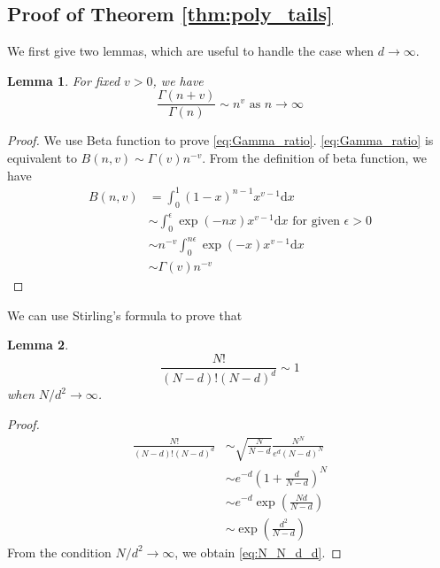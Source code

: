 \documentclass[conference,a4paper]{IEEEtran}
\def\dd{\mathrm{d}}
\newtheorem{lemma}{Lemma}
\begin{document}
\subsection{Proof of Theorem \ref{thm:poly_tails}}
We first give two lemmas, which are useful to handle the case when $d\to \infty$.
\begin{lemma}\label{lem:Gamma_ratio}
     For fixed $v>0$, we have
     \begin{equation}\label{eq:Gamma_ratio}
         \frac{\Gamma(n+v)}{\Gamma(n)} \sim
         n^v
         \textrm{ as } n \to \infty             
     \end{equation}
 \end{lemma}
 \begin{proof}
     We use Beta function to prove \eqref{eq:Gamma_ratio}.
     \eqref{eq:Gamma_ratio} is equivalent to
     $B(n, v) \sim \Gamma(v) n^{-v}$.
     From the definition of beta function,
     we have
     \begin{align*}
         B(n,v) &=\int_0^1 (1-x)^{n-1} x^{v-1} \dd x \\
         &\sim \int_0^{\epsilon} \exp(-nx) x^{v-1}\dd x \textrm{ for given } \epsilon>0\\
         & \sim n^{-v} \int_0^{n\epsilon} \exp(-x)x^{v-1}\dd x\\
         &\sim \Gamma(v) n^{-v}
     \end{align*}
 \end{proof}
We can use Stirling's formula to prove that
\begin{lemma}\label{lem:NNdd}
\begin{equation}\label{eq:N_N_d_d}
     \frac{N!}{(N-d)! (N-d)^d} \sim 1
\end{equation}
when $N/d^2 \to \infty$.
\end{lemma}
\begin{proof}
     \begin{align*}
          \frac{N!}{(N-d)! (N-d)^d}
          &\sim \sqrt{\frac{N}{N-d}}\frac{N^N}{ e^d (N-d)^{N}}\\
          &\sim e^{-d} (1+\frac{d}{N-d})^{N} \\
          &\sim e^{-d} \exp(\frac{Nd}{N-d}) \\
          & \sim \exp(\frac{d^2}{N-d})
     \end{align*}
From the condition $N/d^2 \to \infty$,
we obtain \eqref{eq:N_N_d_d}.
\end{proof}
\end{document}
